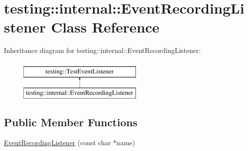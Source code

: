 \hypertarget{classtesting_1_1internal_1_1EventRecordingListener}{}\section{testing\+::internal\+::Event\+Recording\+Listener Class Reference}
\label{classtesting_1_1internal_1_1EventRecordingListener}
Inheritance diagram for testing\+::internal\+::Event\+Recording\+Listener\+:\begin{figure}[H]
\begin{center}
\leavevmode
\includegraphics[height=2.000000cm]{classtesting_1_1internal_1_1EventRecordingListener}
\end{center}
\end{figure}
\subsection*{Public Member Functions}
\begin{DoxyCompactItemize}
\item 
\mbox{\hyperlink{classtesting_1_1internal_1_1EventRecordingListener_a7b0254c15d6b8468e1441ee572fee707}{Event\+Recording\+Listener}} (const char $\ast$name)
\end{DoxyCompactItemize}

